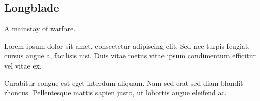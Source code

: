 \subsection{Longblade}

A mainstay of warfare.

\begin{quotebox}
Lorem ipsum dolor sit amet, consectetur adipiscing elit. Sed nec turpis feugiat, cursus augue a, facilisis nisi. Duis vitae metus vitae ipsum condimentum efficitur vel vitae ex.
\end{quotebox}

\begin{quotebox}
Curabitur congue est eget interdum aliquam. Nam sed erat sed diam blandit rhoncus. Pellentesque mattis sapien justo, ut lobortis augue eleifend ac.
\end{quotebox}
